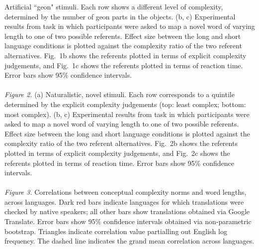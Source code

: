 \documentclass[12pt]{article}
\newcounter{lastnote}
\begin{document}
 Artificial ``geon" stimuli. Each row shows a different level of complexity, determined by the number of geon parts in the objects. (b, c) Experimental results from task in which participants were asked to map a novel word of varying length to one of two possible referents. Effect size between the long and short language conditions is plotted against the complexity ratio of the two referent alternatives. Fig.\ 1b shows the referents plotted in terms of explicit complexity judgements, and Fig.\ 1c shows the referents plotted in terms of reaction time. Error bars show 95\% confidence intervals.
 \\
 \\
  {\it Figure 2.} (a) Naturalistic, novel stimuli. Each row corresponds to a quintile determined by the explicit complexity judgements (top: least complex; bottom: most complex). (b, c) Experimental results from task in which participants were asked to map a novel word of varying length to one of two possible referents. Effect size between the long and short language conditions is plotted against the complexity ratio of the two referent alternatives. Fig.\ 2b shows the referents plotted in terms of explicit complexity judgements, and Fig.\ 2c shows the referents plotted in terms of reaction time. Error bars show 95\% confidence intervals.
  \\
  \\ 
 {\it Figure 3.}  Correlations between conceptual complexity norms and word lengths, across languages. Dark red bars indicate languages for which translations were checked by native speakers; all other bars show translations obtained via Google Translate. Error bars show 95\% confidence intervals obtained via non-parametric bootstrap. Triangles indicate correlation value partialling out English log frequency. The dashed line indicates the grand mean correlation across languages.







\end{document}

